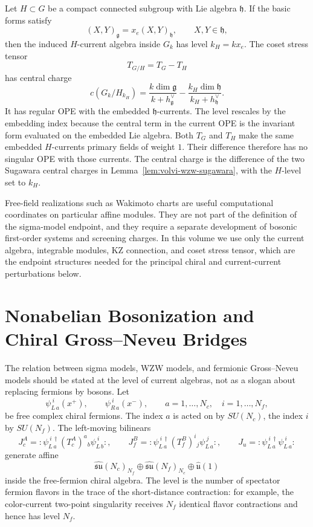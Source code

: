 Let \(H\subset G\) be a compact connected subgroup with Lie algebra
\(\mathfrak h\).  If the basic forms satisfy
\[
  (X,Y)_{\mathfrak g}=x_e(X,Y)_{\mathfrak h},
  \qquad X,Y\in\mathfrak h,
\]
then the induced \(H\)-current algebra inside \(G_k\) has level
\(k_H=kx_e\).  The coset stress tensor
\begin{equation}
  T_{G/H}=T_G-T_H
  \label{eq:volvi-gko-coset-stress-tensor}
\end{equation}
has central charge
\begin{equation}
  c(G_k/H_{k_H})
  =
  \frac{k\dim\mathfrak g}{k+h^\vee_{\mathfrak g}}
  -
  \frac{k_H\dim\mathfrak h}{k_H+h^\vee_{\mathfrak h}} .
  \label{eq:volvi-gko-coset-central-charge}
\end{equation}
It has regular OPE with the embedded \(\mathfrak h\)-currents.
The level rescales by the embedding index because the central term in the
current OPE is the invariant form evaluated on the embedded Lie algebra.
Both \(T_G\) and \(T_H\) make the same embedded \(H\)-currents primary fields
of weight \(1\).  Their difference therefore has no singular OPE with those
currents.  The central charge is the difference of the two Sugawara central
charges in Lemma~\ref{lem:volvi-wzw-sugawara}, with the \(H\)-level
set to \(k_H\).

Free-field realizations such as Wakimoto charts are useful computational
coordinates on particular affine modules.  They are not part of the
definition of the sigma-model endpoint, and they require a separate
development of bosonic first-order systems and screening charges.  In this
volume we use only the current algebra, integrable modules, KZ connection,
and coset stress tensor, which are the endpoint structures needed for the
principal chiral and current-current perturbations below.

\section{Nonabelian Bosonization and Chiral Gross--Neveu Bridges}
\label{sec:integrable-nonabelian-bosonization-gn-bridges}

The relation between sigma models, WZW models, and fermionic Gross--Neveu
models should be stated at the level of current algebras, not as a slogan
about replacing fermions by bosons.  Let
\[
  \psi_{L\,a}^{\ i}(x^+),\qquad
  \psi_{R\,a}^{\ i}(x^-),
  \qquad
  a=1,\ldots,N_c,\quad i=1,\ldots,N_f,
\]
be free complex chiral fermions.  The index \(a\) is acted on by
\(SU(N_c)\), the index \(i\) by \(SU(N_f)\).  The left-moving bilinears
\[
  J_{c}^{A}=:\psi_{L\,a}^{\ i\,\dagger}(T_c^A)^a{}_{b}\psi_{L\,b}^{\ i}:,
  \qquad
  J_{f}^{B}=:\psi_{L\,a}^{\ i\,\dagger}(T_f^B)^i{}_{j}\psi_{L\,a}^{\ j}:,
  \qquad
  J_{u}=:\psi_{L\,a}^{\ i\,\dagger}\psi_{L\,a}^{\ i}:
\]
generate affine
\[
  \widehat{\mathfrak{su}}(N_c)_{N_f}\oplus
  \widehat{\mathfrak{su}}(N_f)_{N_c}\oplus \widehat{\mathfrak u}(1)
\]
inside the free-fermion chiral algebra.  The level is the number of spectator
fermion flavors in the trace of the short-distance contraction: for example,
the color-current two-point singularity receives \(N_f\) identical flavor
contractions and hence has level \(N_f\).

